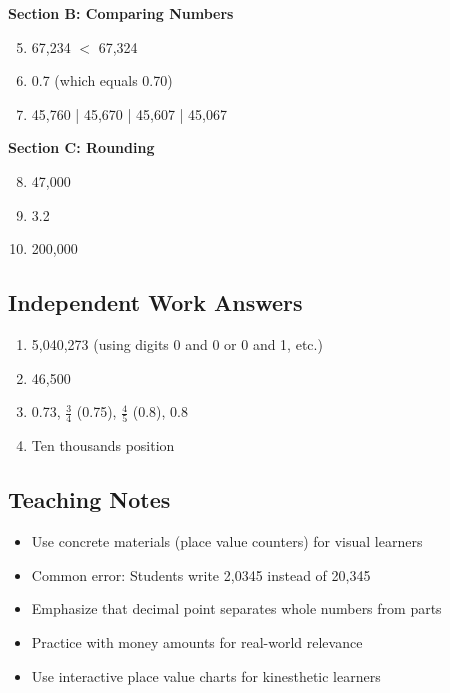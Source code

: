 \documentclass{article}
\begin{document}
\textbf{Section B: Comparing Numbers}
\begin{enumerate}
    \setcounter{enumi}{4}
    \item 67,234 $<$ 67,324
    \item 0.7 (which equals 0.70)
    \item 45,760 | 45,670 | 45,607 | 45,067
\end{enumerate}

\textbf{Section C: Rounding}
\begin{enumerate}
    \setcounter{enumi}{7}
    \item 47,000
    \item 3.2
    \item 200,000
\end{enumerate}

\subsection*{Independent Work Answers}
\begin{enumerate}
    \item 5,040,273 (using digits 0 and 0 or 0 and 1, etc.)
    \item 46,500
    \item 0.73, $\frac{3}{4}$ (0.75), $\frac{4}{5}$ (0.8), 0.8
    \item Ten thousands position
\end{enumerate}

\subsection*{Teaching Notes}
\begin{itemize}
    \item Use concrete materials (place value counters) for visual learners
    \item Common error: Students write 2,0345 instead of 20,345
    \item Emphasize that decimal point separates whole numbers from parts
    \item Practice with money amounts for real-world relevance
    \item Use interactive place value charts for kinesthetic learners
\end{itemize}
\end{document}
